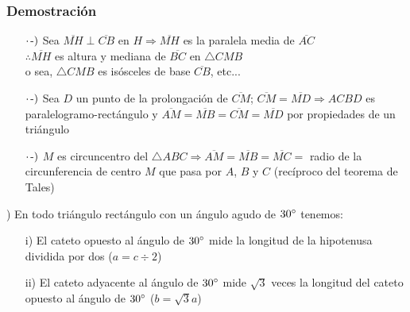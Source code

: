 \subsubsection{Demostración}
\begin{itemize}
    \item[$\cdot\hspace{0.05cm}\text{-})$] Sea $\overline{MH}\perp\overline{CB}$ en $H \Longrightarrow \overline{MH}$ es la paralela media de $\overline{AC}$\\
\hspace*{2cm}$\therefore \overline{MH}$ es altura y mediana de $\overline{BC}$ en $\triangle CMB$\\
\hspace*{2cm}o sea, $\triangle CMB$ es isósceles de base $\overline{CB}$, etc...

    \item[$\cdot\hspace{0.05cm}\text{-})$] Sea $D$ un punto de la prolongación de $\overline{CM}$; $\overline{CM} =\overline{MD} \Longrightarrow ACBD$ es paralelogramo-rectángulo y $\overline{AM}=\overline{MB}=\overline{CM}=\overline{MD}$ por propiedades de un triángulo

    \item[$\cdot\hspace{0.05cm}\text{-})$] $M$ es circuncentro del $\triangle ABC \Longrightarrow \overline{AM}=\overline{MB}=\overline{MC}=$ radio de la circunferencia de centro $M$ que pasa por $A$, $B$ y $C$ (recíproco del teorema de Tales)
\end{itemize}


) En todo triángulo rectángulo con un ángulo agudo de $30\degree$ tenemos:
\begin{itemize}
    \item[i)]El cateto opuesto al ángulo de $30\degree$ mide la longitud de la hipotenusa dividida por dos ($a = c \div 2$) 
    \item[ii)]El cateto adyacente al ángulo de $30\degree$ mide $\sqrt{3}$ veces la longitud del cateto opuesto al ángulo de $30\degree$ ($b = \sqrt{3}a$)
\end{itemize}

